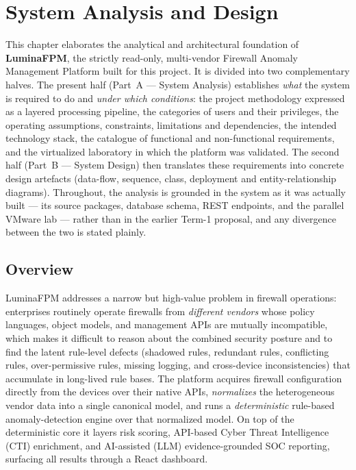 \chapter{System Analysis and Design}
\label{ch:analysis-design}

This chapter elaborates the analytical and architectural foundation of \textbf{LuminaFPM}, the strictly read-only, multi-vendor Firewall Anomaly Management Platform built for this project. It is divided into two complementary halves. The present half (Part~A — System Analysis) establishes \emph{what} the system is required to do and \emph{under which conditions}: the project methodology expressed as a layered processing pipeline, the categories of users and their privileges, the operating assumptions, constraints, limitations and dependencies, the intended technology stack, the catalogue of functional and non-functional requirements, and the virtualized laboratory in which the platform was validated. The second half (Part~B — System Design) then translates these requirements into concrete design artefacts (data-flow, sequence, class, deployment and entity-relationship diagrams). Throughout, the analysis is grounded in the system as it was actually built — its source packages, database schema, REST endpoints, and the parallel VMware lab — rather than in the earlier Term-1 proposal, and any divergence between the two is stated plainly.

\section{Overview}
\label{sec:ch3-overview}

LuminaFPM addresses a narrow but high-value problem in firewall operations: enterprises routinely operate firewalls from \emph{different vendors} whose policy languages, object models, and management APIs are mutually incompatible, which makes it difficult to reason about the combined security posture and to find the latent rule-level defects (shadowed rules, redundant rules, conflicting rules, over-permissive rules, missing logging, and cross-device inconsistencies) that accumulate in long-lived rule bases. The platform acquires firewall configuration directly from the devices over their native APIs, \emph{normalizes} the heterogeneous vendor data into a single canonical model, and runs a \emph{deterministic} rule-based anomaly-detection engine over that normalized model. On top of the deterministic core it layers risk scoring, API-based Cyber Threat Intelligence (CTI) enrichment, and AI-assisted (LLM) evidence-grounded SOC reporting, surfacing all results through a React dashboard.

